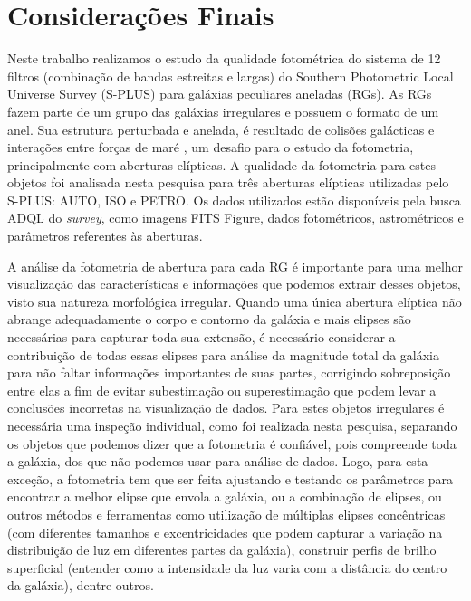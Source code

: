 \chapter{Considerações Finais}

Neste trabalho realizamos o estudo da qualidade fotométrica do sistema de 12 filtros (combinação de
bandas estreitas e largas) do Southern Photometric Local Universe Survey (S-PLUS) para galáxias peculiares aneladas (RGs). As RGs fazem parte de um grupo das galáxias irregulares e possuem o formato de um anel. Sua estrutura perturbada e anelada, é resultado de colisões galácticas e interações entre forças de maré \cite{2010arnab}, um desafio para o estudo da fotometria, principalmente com aberturas elípticas. A qualidade da fotometria para estes objetos foi analisada nesta pesquisa para três aberturas elípticas utilizadas pelo S-PLUS: AUTO, ISO e PETRO. Os dados utilizados estão disponíveis pela busca ADQL do \emph{survey}, como imagens FITS Figure, dados fotométricos, astrométricos e parâmetros referentes às aberturas.

A análise da fotometria de abertura para cada RG é importante para uma melhor visualização das características e informações que podemos extrair desses objetos, visto sua natureza morfológica irregular. Quando uma única abertura elíptica não abrange adequadamente o corpo e contorno da galáxia e mais elipses são necessárias para capturar toda sua extensão, é necessário considerar a contribuição de todas essas elipses para análise da magnitude total da galáxia para não faltar informações importantes de suas partes, corrigindo sobreposição entre elas a fim de evitar subestimação ou superestimação que podem levar a conclusões incorretas na visualização de dados. Para estes objetos irregulares é necessária uma inspeção individual, como foi realizada nesta pesquisa, separando os objetos que podemos dizer que a fotometria é confiável, pois compreende toda a galáxia, dos que não podemos usar para análise de dados. Logo, para esta exceção, a fotometria tem que ser feita ajustando e testando os parâmetros para encontrar a melhor elipse que envola a galáxia, ou a combinação de elipses, ou outros métodos e ferramentas como utilização de múltiplas elipses concêntricas (com diferentes tamanhos e excentricidades que podem capturar a variação na distribuição de luz em diferentes partes da galáxia), construir perfis de brilho superficial (entender como a intensidade da luz varia com a distância do centro da galáxia), dentre outros.

